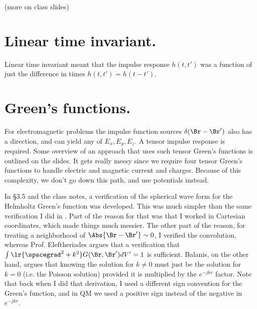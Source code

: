(more on class slides)
%
\section{Linear time invariant.}
%
Linear time invariant meant that the impulse response \( h(t,t') \) was a function of just the difference in times \( h(t,t') = h(t-t') \).
%
\section{Green's functions.}
%
For electromagnetic problems the impulse function sources \( \delta(\Br - \Br') \) also has a direction, and can yield any of \( E_x, E_y, E_z \).  A tensor impulse response is required.
%
Some overview of an approach that uses such tensor Green's functions is outlined on the slides.  It gets really messy since we require four tensor Green's functions to handle electric and magnetic current and charges.  Because of this complexity, we don't go down this path, and use potentials instead.

In \S 3.5 \citep{balanis2005antenna} and the class notes, a verification of the spherical wave form for the Helmholtz Green's function was developed.  This was much simpler than the same verification I did in \citep{phy456:helmoltzGreens}.  Part of the reason for that was that I worked in Cartesian coordinates, which made things much messier.  The other part of the reason, for treating a neighborhood of \( \Abs{\Br - \Br'} \sim 0 \), I verified the convolution, whereas Prof. Eleftheriades argues that a verification that \( \int \lr{\spacegrad^2 + k^2} G(\Br, \Br') dV' = 1\) is sufficient.  Balanis, on the other hand, argues that knowing the solution for \( k \ne 0 \) must just be the solution for \( k = 0 \) (i.e. the Poisson solution) provided it is multiplied by the \( e^{-j k r} \) factor.
%
Note that back when I did that derivation, I used a different sign convention for the Green's function, and in QM we used a positive sign instead of the negative in \( e^{-j k r } \).
%
%
%
%
